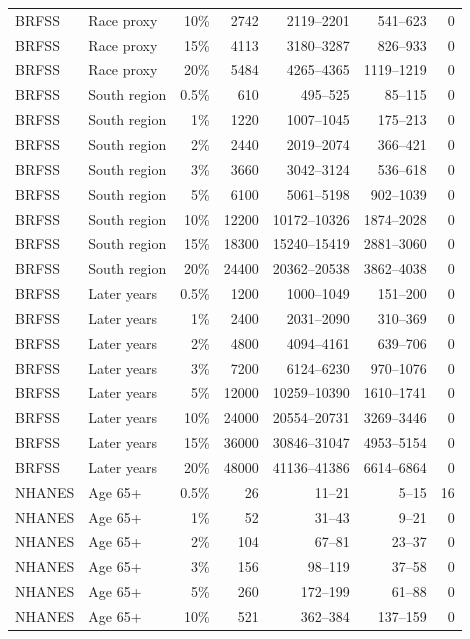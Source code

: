 \begin{longtable}{llrrrrr}
BRFSS & Race proxy & 10\% & 2742 & 2119--2201 & 541--623 & 0 \\
BRFSS & Race proxy & 15\% & 4113 & 3180--3287 & 826--933 & 0 \\
BRFSS & Race proxy & 20\% & 5484 & 4265--4365 & 1119--1219 & 0 \\
BRFSS & South region & 0.5\% & 610 & 495--525 & 85--115 & 0 \\
BRFSS & South region & 1\% & 1220 & 1007--1045 & 175--213 & 0 \\
BRFSS & South region & 2\% & 2440 & 2019--2074 & 366--421 & 0 \\
BRFSS & South region & 3\% & 3660 & 3042--3124 & 536--618 & 0 \\
BRFSS & South region & 5\% & 6100 & 5061--5198 & 902--1039 & 0 \\
BRFSS & South region & 10\% & 12200 & 10172--10326 & 1874--2028 & 0 \\
BRFSS & South region & 15\% & 18300 & 15240--15419 & 2881--3060 & 0 \\
BRFSS & South region & 20\% & 24400 & 20362--20538 & 3862--4038 & 0 \\
BRFSS & Later years & 0.5\% & 1200 & 1000--1049 & 151--200 & 0 \\
BRFSS & Later years & 1\% & 2400 & 2031--2090 & 310--369 & 0 \\
BRFSS & Later years & 2\% & 4800 & 4094--4161 & 639--706 & 0 \\
BRFSS & Later years & 3\% & 7200 & 6124--6230 & 970--1076 & 0 \\
BRFSS & Later years & 5\% & 12000 & 10259--10390 & 1610--1741 & 0 \\
BRFSS & Later years & 10\% & 24000 & 20554--20731 & 3269--3446 & 0 \\
BRFSS & Later years & 15\% & 36000 & 30846--31047 & 4953--5154 & 0 \\
BRFSS & Later years & 20\% & 48000 & 41136--41386 & 6614--6864 & 0 \\
NHANES & Age 65+ & 0.5\% & 26 & 11--21 & 5--15 & 16 \\
NHANES & Age 65+ & 1\% & 52 & 31--43 & 9--21 & 0 \\
NHANES & Age 65+ & 2\% & 104 & 67--81 & 23--37 & 0 \\
NHANES & Age 65+ & 3\% & 156 & 98--119 & 37--58 & 0 \\
NHANES & Age 65+ & 5\% & 260 & 172--199 & 61--88 & 0 \\
NHANES & Age 65+ & 10\% & 521 & 362--384 & 137--159 & 0 \\

\end{longtable}
